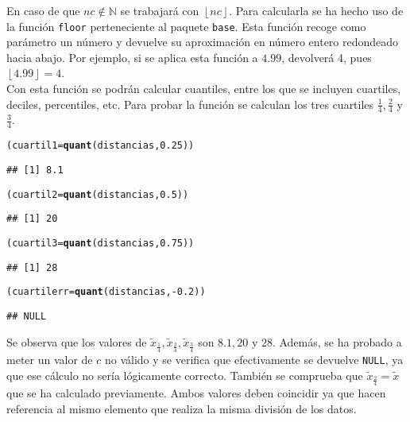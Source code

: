 \documentclass[12pt]{report}\usepackage[]{graphicx}\usepackage[dvipsnames]{xcolor}
\makeatletter
\newcommand{\hlnum}[1]{\textcolor[rgb]{0.686,0.059,0.569}{#1}}%
\newcommand{\hlopt}[1]{\textcolor[rgb]{0,0,0}{#1}}%
\newcommand{\hlstd}[1]{\textcolor[rgb]{0.345,0.345,0.345}{#1}}%
\newcommand{\hlkwb}[1]{\textcolor[rgb]{0.69,0.353,0.396}{#1}}%
\newcommand{\hlkwd}[1]{\textcolor[rgb]{0.737,0.353,0.396}{\textbf{#1}}}%
\newenvironment{kframe}{%
 \def\at@end@of@kframe{}%
 \ifinner\ifhmode%
  \def\at@end@of@kframe{\end{minipage}}%
  \begin{minipage}{\columnwidth}%
 \fi\fi%
 \def\FrameCommand##1{\hskip\@totalleftmargin \hskip-\fboxsep
 \colorbox{shadecolor}{##1}\hskip-\fboxsep
     \hskip-\linewidth \hskip-\@totalleftmargin \hskip\columnwidth}%
 \MakeFramed {\advance\hsize-\width
   \@totalleftmargin\z@ \linewidth\hsize
   \@setminipage}}%
 {\par\unskip\endMakeFramed%
 \at@end@of@kframe}
\newenvironment{knitrout}{}{} %
\makeatother
\begin{document}
			En caso de que $nc \not \in \mathbb{N}$ se trabajará con $\left\lfloor nc \right\rfloor$. Para calcularla se ha hecho uso de la función \texttt{floor} perteneciente al paquete \texttt{base}. Esta función recoge como parámetro un número y devuelve su aproximación en número entero redondeado hacia abajo. Por ejemplo, si se aplica esta función a $4.99$, devolverá 4, pues $\left\lfloor4.99\right\rfloor = 4$.\\
			
			Con esta función se podrán calcular cuantiles, entre los que se incluyen cuartiles, deciles, percentiles, etc. Para probar la función se calculan los tres cuartiles $\frac{1}{4}, \frac{2}{4}$ y $\frac{3}{4}$.
			
\begin{knitrout}
\color{fgcolor}\begin{kframe}
\begin{alltt}
\hlstd{(cuartil1} \hlkwb{=} \hlkwd{quant}\hlstd{(distancias,}\hlnum{0.25}\hlstd{))}
\end{alltt}
\begin{verbatim}
## [1] 8.1
\end{verbatim}
\begin{alltt}
\hlstd{(cuartil2} \hlkwb{=} \hlkwd{quant}\hlstd{(distancias,}\hlnum{0.5}\hlstd{))}
\end{alltt}
\begin{verbatim}
## [1] 20
\end{verbatim}
\begin{alltt}
\hlstd{(cuartil3} \hlkwb{=} \hlkwd{quant}\hlstd{(distancias,}\hlnum{0.75}\hlstd{))}
\end{alltt}
\begin{verbatim}
## [1] 28
\end{verbatim}
\begin{alltt}
\hlstd{(cuartilerr} \hlkwb{=} \hlkwd{quant}\hlstd{(distancias,} \hlopt{-}\hlnum{0.2}\hlstd{))}
\end{alltt}
\begin{verbatim}
## NULL
\end{verbatim}
\end{kframe}
\end{knitrout}
			
			Se observa que los valores de $\tilde{x}_{\frac{1}{4}}, \tilde{x}_{\frac{2}{4}}, \tilde{x}_{\frac{3}{4}}$ son $8.1, 20$ y $28$. Además, se ha probado a meter un valor de $c$ no válido y se verifica que efectivamente se devuelve \texttt{NULL}, ya que ese cálculo no sería lógicamente correcto. También se comprueba que $\tilde{x}_{\frac{2}{4}} = \tilde{x}$ que se ha calculado previamente. Ambos valores deben coincidir ya que hacen referencia al mismo elemento que realiza la misma división de los datos.
			
\end{document}
